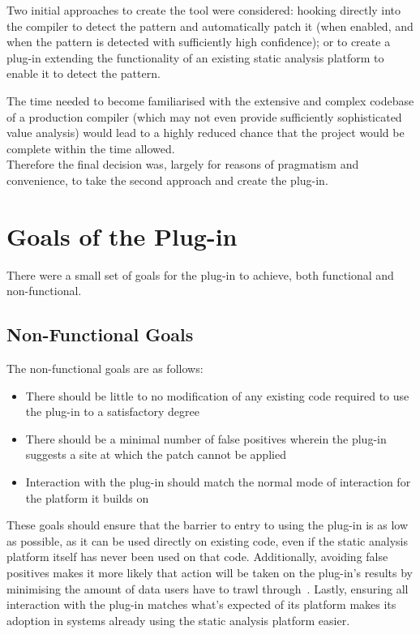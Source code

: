 Two initial approaches to create the tool were considered: hooking directly into the compiler to detect the pattern and automatically patch it (when enabled, and when the pattern is detected with sufficiently high confidence); or to create a plug-in extending the functionality of an existing static analysis platform to enable it to detect the pattern.

The time needed to become familiarised with the extensive and complex codebase of a production compiler (which may not even provide sufficiently sophisticated value analysis) would lead to a highly reduced chance that the project would be complete within the time allowed. \\
Therefore the final decision was, largely for reasons of pragmatism and convenience, to take the second approach and create the  plug-in.

\section{Goals of the Plug-in}

There were a small set of goals for the plug-in to achieve, both functional and non-functional.

\subsection{Non-Functional Goals}

The non-functional goals are as follows:

\begin{itemize}
	\itemsep-0.25em
	\item There should be little to no modification of any existing code required to use the plug-in to a satisfactory degree
	\item There should be a minimal number of false positives wherein the plug-in suggests a site at which the patch cannot be applied
	\item Interaction with the plug-in should match the normal mode of interaction for the platform it builds on
\end{itemize}

These goals should ensure that the barrier to entry to using the plug-in is as low as possible, as it can be used directly on existing code, even if the static analysis platform itself has never been used on that code. Additionally, avoiding false positives makes it more likely that action will be taken on the plug-in's results by minimising the amount of data users have to trawl through~\cite{infervideo}. Lastly, ensuring all interaction with the plug-in matches what's expected of its platform makes its adoption in systems already using the static analysis platform easier.

